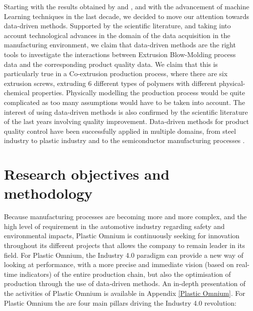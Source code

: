 Starting with the results obtained by \citep{diraddo1993line} and \citep{ramana2013data}, and with the advancement of machine Learning techniques in the last decade, we decided to move our attention towards data-driven methods. Supported by the scientific literature, and taking into account technological advances in the domain of the data acquisition in the manufacturing environment, we claim that data-driven methods are the right tools to investigate the interactions between Extrusion Blow-Molding process data and the corresponding product quality data. We claim that this is particularly true in a Co-extrusion production process, where there are six extrusion screws, extruding 6 different types of polymers with different physical-chemical properties. Physically modelling the production process would be quite complicated as too many assumptions would have to be taken into account. The interest of using data-driven methods is also confirmed by the scientific literature of the last years involving quality improvement. Data-driven methods for product quality control have been successfully applied in multiple domains, from steel industry \citep{lieber2013quality,li2018ensemble} to plastic industry \citep{chen2008neural,nagorny2017quality,haeussler1996quality,tellaeche2013machine,sharma2017taguchi} and to the semiconductor manufacturing processes \citep{melhem2016regression,lenz2013data,jiang2020novel}.

\section{Research objectives and methodology}

Because manufacturing processes are becoming more and more complex, and the high level of requirement in the automotive industry regarding safety and environmental impacts, Plastic Omnium is continuously seeking for innovation throughout its different projects that allows the company to remain leader in its field. For Plastic Omnium, the Industry 4.0 paradigm can provide a new way of looking at performance, with a more precise and immediate vision (based on real-time indicators) of the entire production chain, but also the optimisation of production through the use of data-driven methods. An in-depth presentation of the activities of Plastic Omnium is available in Appendix \ref{Plastic Omnium}. For Plastic Omnium the are four main pillars driving the Industry 4.0 revolution:

